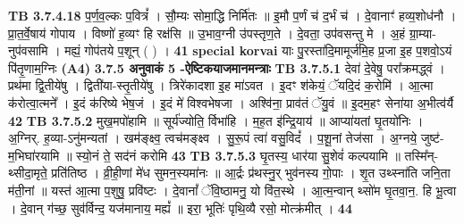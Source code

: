 \documentclass[17pt]{extarticle}
\begin{document}
{{{{{{{{{{{{{{{{{{{                  \newline
                                \textbf{ TB 3.7.4.18} \newline
                  प॒र्ण॒व॒ल्कः प॒वित्रं᳚ । सौ॒म्यः सोमा॒द्धि निर्मि॑तः ॥ इ॒मौ प॒र्णं च॑ द॒र्भं च॑ । दे॒वानाꣳ॑ हव्य॒शोध॑नौ । प्रा॒त॒र्वे॒षाय॑ गोपाय । विष्णो॑ ह॒व्यꣳ हि रक्ष॑सि ॥ उ॒भाव॒ग्नी उ॑पस्तृण॒ते । दे॒वता॒ उप॑वसन्तु मे । अ॒हं ग्रा॒म्या-नुप॑वसामि । मह्यं॒ गोप॑तये प॒शून् ( ) । \textbf{ 41} \newline
                  \newline
                                                        \textbf{special korvai} \newline
              याः पु॒रस्ता॑दि॒मामूर्ज॑मि॒ह प्र॒जा इ॒ह प॒शवो॒ऽयं पि॑तृ॒णाम॒ग्निः \newline
                                [आभृ॑त - इ॒मं - गृ॑ह्णामि॒ पूर्व॒ - स्ताः पुर्वः॒ परि॑गृह्णामि - सभापा॒ला - इन्द्र॑ज्येष्ठेभ्य॒-आदि॑त्य व्रतपते-सुस॒भ्रुंता॑ - मे - स॒ह - पु॑नातु - गहि - नो - वि॒श्वरू॑पा - दधातु॒ - पुन॑र् - गच्छतु - प॒शुन् ( ) ] \textbf{(A4)} \newline \newline
                \textbf{ 3.7.5     अनुवाकं   5 -ऐष्टिकयाजमानमन्त्राः} \newline
                                \textbf{ TB 3.7.5.1} \newline
                  देवा॑ दे॒वेषु॒ परा᳚क्रमद्ध्वं । प्रथ॑मा द्वि॒तीये॑षु । द्विती॑या-स्तृ॒तीये॑षु । त्रिरे॑कादशा इ॒ह मा॑ऽवत । इ॒दꣳ श॑केयं॒ ॅयदि॒दं क॒रोमि॑ । आ॒त्मा क॑रोत्वा॒त्मने᳚ । इ॒दं क॑रिष्ये भेष॒जं । इ॒दं मे॑ विश्वभेषजा । अश्वि॑ना॒ प्राव॑तं ॅयु॒वं ॥ इ॒दम॒हꣳ सेना॑या अ॒भीत्व॑र्यै \textbf{ 42} \newline
                  \newline
                                \textbf{ TB 3.7.5.2} \newline
                  मुख॒मपो॑हामि ॥ सूर्य॑ज्योति॒ र्विभा॑हि । म॒ह॒त इ॑न्द्रि॒याय॑ ॥ आप्या॑यतां घृ॒तयो॑निः । अ॒ग्निर्. ह॒व्या-ऽनु॑मन्यतां । खम॑ङ्क्ष्व॒ त्वच॑मङ्क्ष्व । सु॒रू॒पं त्वा॑ वसु॒विदं᳚ । प॒शू॒नां तेज॑सा । अ॒ग्नये॒ जुष्ट॑-म॒भिघा॑रयामि ॥ स्यो॒नं ते॒ सद॑नं करोमि \textbf{ 43} \newline
                  \newline
                                \textbf{ TB 3.7.5.3} \newline
                  घृ॒तस्य॒ धार॑या सु॒शेवं॑ कल्पयामि ॥ तस्मि᳚न्-थ्सीदा॒मृते॒ प्रति॑तिष्ठ । व्री॒ही॒णां मे॑ध सुमन॒स्यमा॑नः ॥ आ॒र्द्रः प्र॑थस्नु॒र् भुव॑नस्य गो॒पाः । शृ॒त उथ्स्ना॑ति जनि॒ता म॑ती॒नां ॥ यस्त॑ आ॒त्मा प॒शुषु॒ प्रवि॑ष्टः । दे॒वानां᳚ ॅवि॒ष्ठामनु॒ यो वि॑त॒स्थे । आ॒त्म॒न्वान् थ्सो॑म घृ॒तवा॒न॒. हि भू॒त्वा । दे॒वान् ग॑च्छ॒ सुव॑र्विन्द॒ यज॑मानाय॒ मह्यं᳚ ॥ इरा॒ भूतिः॑ पृथि॒व्यै रसो॒ मोत्क्र॑मीत् । \textbf{ 44} \newline
}}}}}}}}}}}}}}}}}}}
\end{document}

